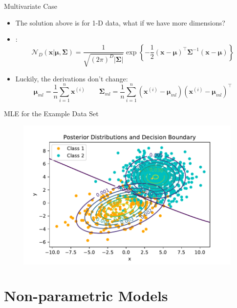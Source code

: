 \begin{frame}{Multivariate Case}{}
	\begin{itemize}
		\item The solution above is for 1-D data, what if we have more dimensions?
		\item {}:
		\begin{equation}
			\mathcal{N}_D(\bm{x} \vert \bm{\mu}, \bm{\Sigma})
				= \frac{1}{\sqrt{(2 \pi)^D \vert \bm{\Sigma} \vert}}
					\exp\left\{ -\frac{1}{2} (\bm{x} - \bm{\mu})^{\intercal} \bm{\Sigma}^{-1} (\bm{x} - \bm{\mu}) \right\}
		\end{equation}
		\item Luckily, the derivations don't change:
		\begin{equation}
			\bm{\mu}_{ml} = \frac{1}{n} \sum_{i=1}^n \bm{x}^{(i)}
			\qquad
			\bm{\Sigma}_{ml} = \frac{1}{n} \sum_{i=1}^n (\bm{x}^{(i)} - \bm{\mu}_{ml}) (\bm{x}^{(i)} - \bm{\mu}_{ml})^{\intercal}
		\end{equation}
	\end{itemize}
\end{frame}


\begin{frame}{MLE for the Example Data Set}{}
	\begin{figure}
		\centering
		\includegraphics[scale=0.55]{04_density_estimation/02_img/pde_boundary}
	\end{figure}
\end{frame}


\section{Non-parametric Models}

